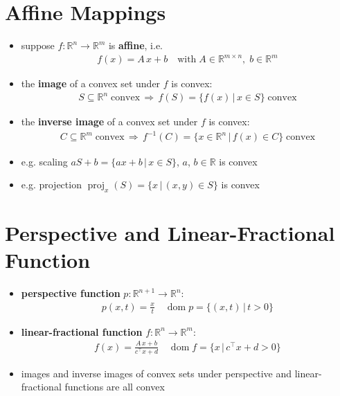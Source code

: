 \documentclass[11pt]{extarticle}
\newcommand{\ds}{\displaystyle}
\newcommand{\ie}{\,\Longrightarrow\,}
\DeclareMathOperator*{\dom}{dom}
\DeclareMathOperator*{\proj}{proj}
\theoremstyle{definition}
\begin{document}
\newpage

\section*{Affine Mappings}

\begin{itemize}
  \item suppose $\ds f:\mathbb{R}^n\to\mathbb{R}^m$ is {\bf affine}, i.e. 
    \begin{align*}
      f(x) = A\,x + b\quad\text{with}\;A\in\mathbb{R}^{m\times n},\;b\in\mathbb{R}^m
    \end{align*}
  \item the {\bf image} of a convex set under $f$ is convex: 
    \begin{align*}
      S\subseteq\mathbb{R}^n\;\text{convex}\ie f(S) = \{f(x)\,|\,x\in S\}\;\text{convex}
    \end{align*}
  \item the {\bf inverse image} of a convex set under $f$ is convex: 
    \begin{align*}
      C\subseteq\mathbb{R}^m\;\text{convex}\ie f^{-1}(C) = \{x\in\mathbb{R}^n\,|\,f(x)\in C\}\;\text{convex}
    \end{align*}
  \item e.g. scaling $\ds a S + b = \{a x + b\,|\,x\in S\}$, $a$, $b\in\mathbb{R}$ is convex
  \item e.g. projection $\ds \proj_x(S) = \{x\,|\,(x, y)\in S\}$ is convex
\end{itemize}

\newpage

\section*{Perspective and Linear-Fractional Function}

\begin{itemize}
  \item {\bf perspective function} $\ds p:\mathbb{R}^{n + 1}\to\mathbb{R}^n$: 
    \begin{align*}
      p(x, t) = \frac{x}{t}\quad\dom p = \{(x, t)\,|\,t > 0\} 
    \end{align*}
  \item {\bf linear-fractional function} $\ds f:\mathbb{R}^n\to\mathbb{R}^m$: 
    \begin{align*}
      f(x) = \frac{A\,x + b}{c^\top x + d}\quad\dom f = \{x\,|\,c^\top x + d > 0\} 
    \end{align*}
  \item images and inverse images of convex sets under perspective and linear-fractional functions are all convex
\end{itemize}
\end{document}
